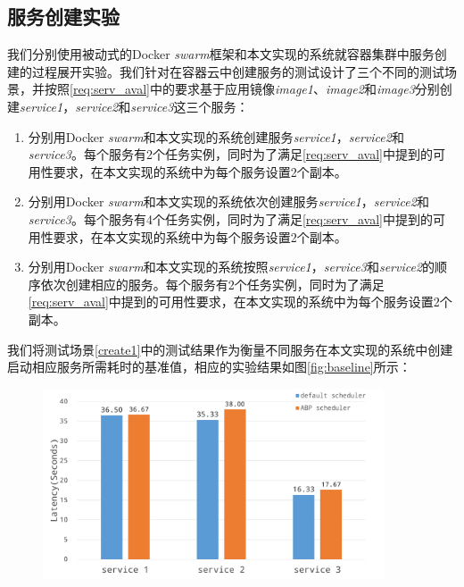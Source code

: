 \subsection{服务创建实验}\label{sec:serv_creation}
我们分别使用被动式的Docker \emph{swarm}框架和本文实现的系统就容器集群中服务创建的过程展开实验。我们针对在容器云中创建服务的测试设计了三个不同的测试场景，并按照\ref{req:serv_aval}中的要求基于应用镜像\emph{image1}、\emph{image2}和\emph{image3}分别创建\emph{service1}，\emph{service2}和\emph{service3}这三个服务：
\begin{enumerate}
\item\label{create1} 分别用Docker \emph{swarm}和本文实现的系统创建服务\emph{service1}，\emph{service2}和\emph{service3}。每个服务有2个任务实例，同时为了满足\ref{req:serv_aval}中提到的可用性要求，在本文实现的系统中为每个服务设置2个副本。
\item\label{create2} 分别用Docker \emph{swarm}和本文实现的系统依次创建服务\emph{service1}，\emph{service2}和\emph{service3}。每个服务有4个任务实例，同时为了满足\ref{req:serv_aval}中提到的可用性要求，在本文实现的系统中为每个服务设置2个副本。
\item\label{create3} 分别用Docker \emph{swarm}和本文实现的系统按照\emph{service1}，\emph{service3}和\emph{service2}的顺序依次创建相应的服务。每个服务有2个任务实例，同时为了满足\ref{req:serv_aval}中提到的可用性要求，在本文实现的系统中为每个服务设置2个副本。
\end{enumerate}

我们将测试场景\ref{create1}中的测试结果作为衡量不同服务在本文实现的系统中创建启动相应服务所需耗时的基准值，相应的实验结果如图\ref{fig:baseline}所示：
\begin{figure}[H]
\centering
\includegraphics[width=0.9\textwidth]{./figure/baseline}
\end{figure}


